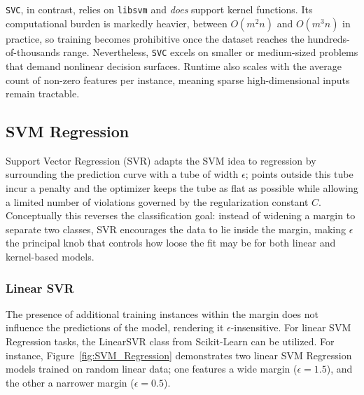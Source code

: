\documentclass[12pt,letter]{article}
\begin{document}
\texttt{SVC}, in contrast, relies on \texttt{libsvm} and \emph{does} support kernel functions. Its computational burden is markedly heavier, between \(O(m^{2} n)\) and \(O(m^{3} n)\) in practice, so training becomes prohibitive once the dataset reaches the hundreds-of-thousands range. Nevertheless, \texttt{SVC} excels on smaller or medium-sized problems that demand nonlinear decision surfaces. Runtime also scales with the average count of non-zero features per instance, meaning sparse high-dimensional inputs remain tractable. 





\vspace{-1ex}
\subsection{SVM Regression}
\label{sec:svr}
\vspace{-1ex}

Support Vector Regression (SVR) adapts the SVM idea to regression by surrounding the prediction curve with a tube of width $\epsilon$; points outside this tube incur a penalty and the optimizer keeps the tube as flat as possible while allowing a limited number of violations governed by the regularization constant $C$.  Conceptually this reverses the classification goal: instead of widening a margin to separate two classes, SVR encourages the data to lie inside the margin, making $\epsilon$ the principal knob that controls how loose the fit may be for both linear and kernel-based models.





\subsubsection{Linear SVR}
\vspace{-1ex}
The presence of additional training instances within the margin does not influence the predictions of the model, rendering it $\epsilon$-insensitive. For linear SVM Regression tasks, the LinearSVR class from Scikit-Learn can be utilized. For instance, 
Figure~\ref{fig:SVM_Regression} demonstrates two linear SVM Regression models trained on random linear data; one features a wide margin ($\epsilon = 1.5$), and the other a narrower margin ($\epsilon = 0.5$).
\end{document}
